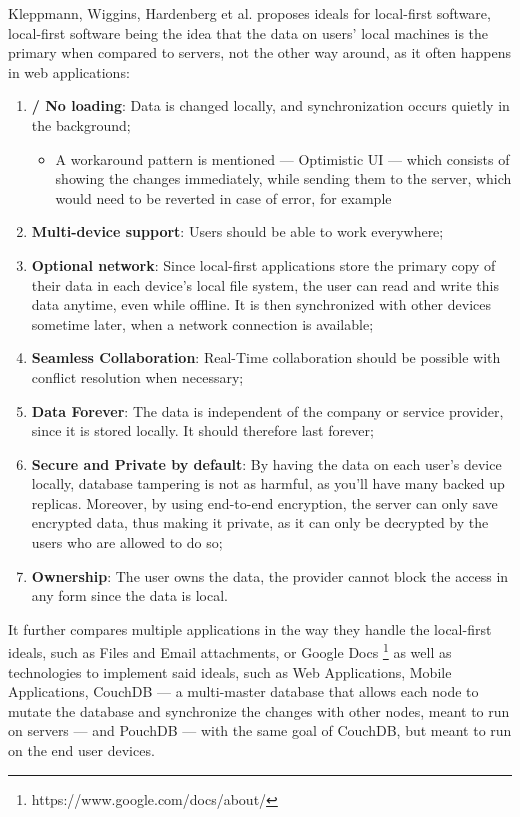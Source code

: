 Kleppmann, Wiggins, Hardenberg et al. \cite{Kleppmann2019} proposes ideals for local-first software, local-first software being the idea that the data on users' local machines is the primary when compared to servers, not the other way around, as it often happens in web applications:

\begin{enumerate}
    \item \textbf{ / No loading}: Data is changed locally, and synchronization occurs quietly in the background;
    \begin{itemize}
        \item A workaround pattern is mentioned --- Optimistic UI --- which consists of showing the changes immediately, while sending them to the server, which would need to be reverted in case of error, for example
    \end{itemize}
    \item \textbf{Multi-device support}: Users should be able to work everywhere;
    \item \textbf{Optional network}: Since local-first applications store the primary copy of their data in each device’s local file system, the user can read and write this data anytime, even while offline. It is then synchronized with other devices sometime later, when a network connection is available;
    \item \textbf{Seamless Collaboration}: Real-Time collaboration should be possible with conflict resolution when necessary;
    \item \textbf{Data Forever}: The data is independent of the company or service provider, since it is stored locally. It should therefore last forever;
    \item \textbf{Secure and Private by default}: By having the data on each user's device locally, database tampering is not as harmful, as you'll have many backed up replicas. Moreover, by using end-to-end encryption, the server can only save encrypted data, thus making it private, as it can only be decrypted by the users who are allowed to do so;
    \item \textbf{Ownership}: The user owns the data, the provider cannot block the access in any form since the data is local.
\end{enumerate}

It further compares multiple applications in the way they handle the local-first ideals, such as Files and Email attachments, or Google Docs \footnote{https://www.google.com/docs/about/} as well as technologies to implement said ideals, such as Web Applications, Mobile Applications, CouchDB \cite{couchdb} --- a multi-master database that allows each node to mutate the database and synchronize the changes with other nodes, meant to run on servers --- and PouchDB \cite{pouchdb} --- with the same goal of CouchDB, but meant to run on the end user devices.

